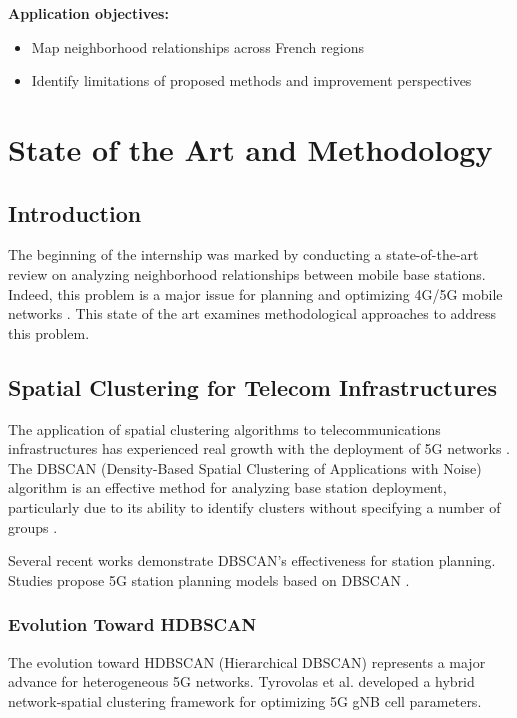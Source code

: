 \documentclass[12pt,a4paper]{report}
\begin{document}
\textbf{Application objectives:}
\begin{itemize}
    \item Map neighborhood relationships across French regions
    \item Identify limitations of proposed methods and improvement perspectives
\end{itemize}

\chapter{State of the Art and Methodology}
\label{chap:etat-art}

\section{Introduction}

The beginning of the internship was marked by conducting a state-of-the-art review on analyzing neighborhood relationships between mobile base stations. Indeed, this problem is a major issue for planning and optimizing 4G/5G mobile networks \cite{rappaport2001wireless}. This state of the art examines methodological approaches to address this problem.

\section{Spatial Clustering for Telecom Infrastructures}

The application of spatial clustering algorithms to telecommunications infrastructures has experienced real growth with the deployment of 5G networks \cite{saunders2007antennas}. The DBSCAN (Density-Based Spatial Clustering of Applications with Noise) algorithm \cite{ester1996density} is an effective method for analyzing base station deployment, particularly due to its ability to identify clusters without specifying a number of groups \cite{kriegel2011density}.

Several recent works demonstrate DBSCAN's effectiveness for station planning. Studies propose 5G station planning models based on DBSCAN \cite{salman2009enhancing}.

\subsection{Evolution Toward HDBSCAN}

The evolution toward HDBSCAN (Hierarchical DBSCAN) \cite{campello2013density} represents a major advance for heterogeneous 5G networks. Tyrovolas et al. \cite{tyrovolas2022hybrid} developed a hybrid network-spatial clustering framework for optimizing 5G gNB cell parameters.
\end{document}

